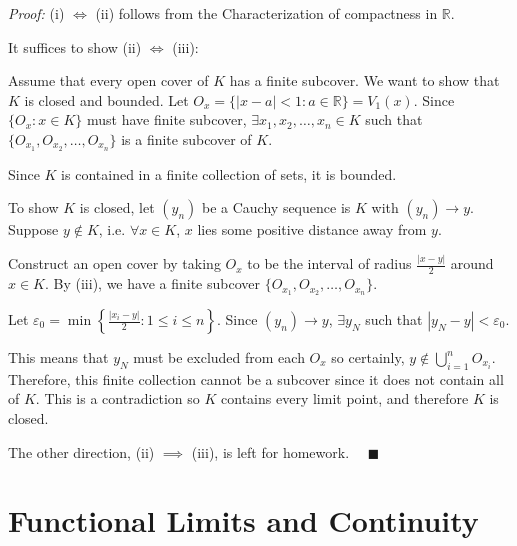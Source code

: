 \documentclass[12pt]{report}
\newcommand{\R}{\mathbb{R}}
\newcommand{\qed}{\quad \blacksquare}
\newcommand{\abs}[1]{\left\vert #1 \right\vert}
\newcommand{\ep}{\varepsilon}
\newenvironment*{tbox}[2][gray]{
    \begin{tcolorbox}[
        parbox=false,
        colback=#1!5!white,
        colframe=#1!75!black,
        breakable,
        title={#2}
    ]}
    {\end{tcolorbox}}
\begin{document}
    \begin{tbox}{\textbf{Theorem (Heine-Borel):} For $K \subseteq \R$, then the following are equivalent: 
        \begin{enumerate}[label=(\roman*)]
            \item $K$ is compact
            \item $K$ is closed and bounded 
            \item Every open cover of $K$ has a finite subcover
        \end{enumerate} }
        \emph{Proof:} (i) $\iff$ (ii) follows from the Characterization of compactness in $\R$. 

        It suffices to show (ii) $\iff$ (iii): 

        Assume that every open cover of $K$ has a finite subcover. We want to show that $K$ is closed and bounded. Let $O_x = \{\abs{x - a} < 1: a \in \R\} = V_1(x)$. Since $\{O_x: x\in K\}$ must have finite subcover, $\exists x_1, x_2, \dots, x_n \in K$ such that $\{O_{x_1}, O_{x_2}, \dots, O_{x_n}\}$ is a finite subcover of $K$. 

        Since $K$ is contained in a finite collection of sets, it is bounded. 

        To show $K$ is closed, let $(y_n)$ be a Cauchy sequence is $K$ with $(y_n) \to y$. Suppose $y \notin K$, i.e. $\forall x \in K$, $x$ lies some positive distance away from $y$. 

        Construct an open cover by taking $O_x$ to be the interval of radius $\frac{\abs{x-y}}{2}$ around $x \in K$. By (iii), we have a finite subcover $\{O_{x_1}, O_{x_2}, \dots, O_{x_n}\}$.
    
        Let $\ep_0 = \min \left\{\frac{\abs{x_i - y}}{2}: 1 \leq i \leq n\right\}$. Since $(y_n) \to y$, $\exists y_N$ such that $\abs{y_N - y} < \ep_0$. 

        This means that $y_N$ must be excluded from each $O_x$ so certainly, $y \notin \bigcup_{i=1}^n O_{x_i}$. Therefore, this finite collection cannot be a subcover since it does not contain all of $K$. This is a contradiction so $K$ contains every limit point, and therefore $K$ is closed.
        
        The other direction, (ii) $\implies$ (iii), is left for homework. $\qed$
    \end{tbox}

\chapter{Functional Limits and Continuity}
\end{document}
